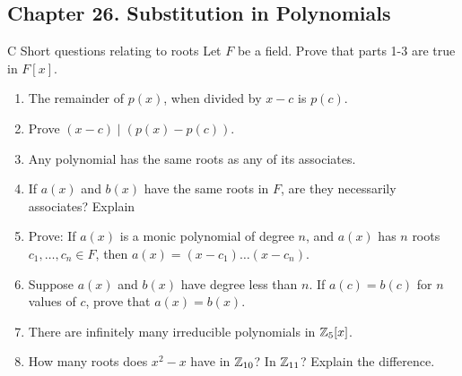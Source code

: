 \subsection*{Chapter 26. Substitution in Polynomials}


\begin{exercise}{C Short questions relating to roots}
Let $F$ be a field. Prove that parts 1-3 are true in $F[x]$.
\begin{enumerate}
    \item The remainder of $p(x)$, when divided by $x-c$ is $p(c)$.
    \item Prove $(x-c)\mid(p(x)-p(c))$.
    \item Any polynomial has the same roots as any of its associates.
    \item If $a(x)$ and $b(x)$ have the same roots in $F$, are they necessarily associates? Explain
    \item Prove: If $a(x)$ is a monic polynomial of degree $n$, and $a(x)$ has $n$ roots $c_1,\dots,c_n\in F$, then $a(x)=(x-c_1)\dots(x-c_n)$.
    \item Suppose $a(x)$ and $b(x)$ have degree less than $n$. If $a(c)=b(c)$ for $n$ values of $c$, prove that $a(x)=b(x)$.
    \item There are infinitely many irreducible polynomials in $\mathbb{Z}_5[x]$.
    \item How many roots does $x^2-x$ have in $\mathbb{Z}_{10}$? In $\mathbb{Z}_{11}$? Explain the difference.
\end{enumerate}
\end{exercise}
